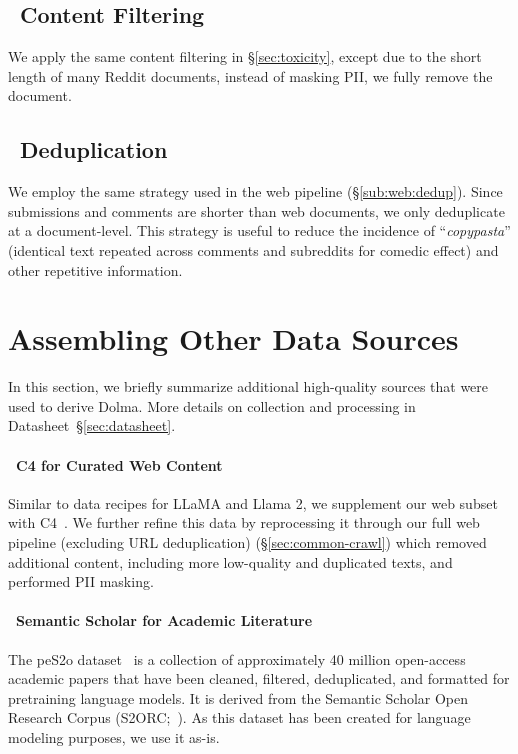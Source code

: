 \documentclass{article}
\newcommand{\dolma}{Dolma\xspace}
\newcommand{\dolmaWeb}{{\color{VarnishAlfaFour}\faGlobe}\xspace}
\newcommand{\dolmaPapers}{{\color{VarnishFoxtrotThree}\faGraduationCap}\xspace}
\newcommand{\toolkitFilter}{{\color{VarnishNovemberThree}\faFilter}\xspace}
\newcommand{\toolkitDedupe}{{\color{VarnishNovemberThree}\faCopy}\xspace}
\begin{document}
\subsection{\toolkitFilter~Content Filtering} 

We apply the same content filtering in \S\ref{sec:toxicity}, except due to the short length of many Reddit documents, instead of masking PII, we fully remove the document. 

\subsection{\toolkitDedupe~Deduplication} 

We employ the same strategy used in the web pipeline (\S\ref{sub:web:dedup}). 
Since submissions and comments are shorter than web documents, we only deduplicate at a document-level. 
This strategy is useful to reduce the incidence of ``\textit{copypasta}'' (identical text repeated across comments and subreddits for comedic effect) and other repetitive information. 

\section{Assembling Other Data Sources}
\label{sec:other-data-sources}

In this section, we briefly summarize additional high-quality sources that were used to derive \dolma. 
More details on collection and processing in Datasheet~\S\ref{sec:datasheet}.

\paragraph{\dolmaWeb~C4 for Curated Web Content}

Similar to data recipes for LLaMA and Llama 2,  we supplement our web subset with C4~\citep{raffel2020exploring}.
We further refine this data by reprocessing it through our full web pipeline (excluding URL deduplication) (\S\ref{sec:common-crawl}) which removed additional content, including more low-quality and duplicated texts, and performed PII masking.

\paragraph{\dolmaPapers~Semantic Scholar for Academic Literature} 

The peS2o dataset~\citep{peS2o} is a collection of approximately 40 million open-access academic papers that have been cleaned, filtered, deduplicated, and formatted for pretraining language models. 
It is derived from the Semantic Scholar Open Research Corpus (S2ORC;~\citealp{lo-etal-2020-s2orc}).
As this dataset has been created for language modeling purposes, we use it as-is. 
\end{document}

